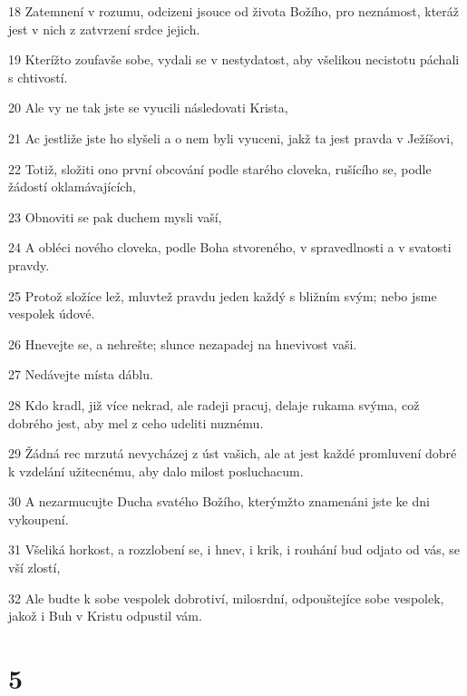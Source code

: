 \par 18 Zatemnení v rozumu, odcizeni jsouce od života Božího, pro neznámost, kteráž jest v nich z zatvrzení srdce jejich.
\par 19 Kterížto zoufavše sobe, vydali se v nestydatost, aby všelikou necistotu páchali s chtivostí.
\par 20 Ale vy ne tak jste se vyucili následovati Krista,
\par 21 Ac jestliže jste ho slyšeli a o nem byli vyuceni, jakž ta jest pravda v Ježíšovi,
\par 22 Totiž, složiti ono první obcování podle starého cloveka, rušícího se, podle žádostí oklamávajících,
\par 23 Obnoviti se pak duchem mysli vaší,
\par 24 A obléci nového cloveka, podle Boha stvoreného, v spravedlnosti a v svatosti pravdy.
\par 25 Protož složíce lež, mluvtež pravdu jeden každý s bližním svým; nebo jsme vespolek údové.
\par 26 Hnevejte se, a nehrešte; slunce nezapadej na hnevivost vaši.
\par 27 Nedávejte místa dáblu.
\par 28 Kdo kradl, již více nekrad, ale radeji pracuj, delaje rukama svýma, což dobrého jest, aby mel z ceho udeliti nuznému.
\par 29 Žádná rec mrzutá nevycházej z úst vašich, ale at jest každé promluvení dobré k vzdelání užitecnému, aby dalo milost posluchacum.
\par 30 A nezarmucujte Ducha svatého Božího, kterýmžto znamenáni jste ke dni vykoupení.
\par 31 Všeliká horkost, a rozzlobení se, i hnev, i krik, i rouhání bud odjato od vás, se vší zlostí,
\par 32 Ale budte k sobe vespolek dobrotiví, milosrdní, odpouštejíce sobe vespolek, jakož i Buh v Kristu odpustil vám.

\chapter{5}

